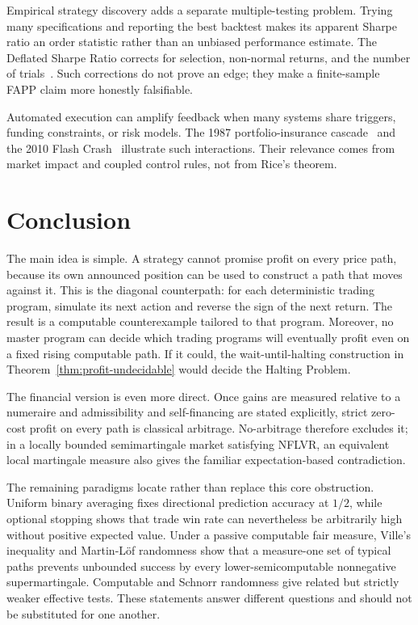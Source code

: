 \documentclass[aps,pra,reprint,superscriptaddress,amsmath,amssymb,floatfix]{revtex4-2}
\theoremstyle{plain}
\theoremstyle{definition}
\theoremstyle{remark}
\begin{document}
Empirical strategy discovery adds a separate multiple-testing problem. Trying
many specifications and reporting the best backtest makes its apparent Sharpe
ratio an order statistic rather than an unbiased performance estimate. The
Deflated Sharpe Ratio corrects for selection, non-normal returns, and the
number of trials~\cite{BaileyLopez2014}. Such corrections do not prove an edge;
they make a finite-sample FAPP claim more honestly falsifiable.

Automated execution can amplify feedback when many systems share triggers,
funding constraints, or risk models. The 1987 portfolio-insurance
cascade~\cite{Brady1988} and the 2010 Flash Crash~\cite{Kirilenko2017} illustrate
such interactions. Their relevance comes from market impact and coupled
control rules, not from Rice's theorem.

\section{Conclusion}
\label{sec:conclusion}

The main idea is simple. A strategy cannot promise profit on every price path,
because its own announced position can be used to construct a path that moves
against it. This is the diagonal counterpath: for each deterministic trading
program, simulate its next action and reverse the sign of the next return. The
result is a computable counterexample tailored to that program. Moreover, no
master program can decide which trading programs will eventually profit even
on a fixed rising computable path. If it could, the wait-until-halting
construction in Theorem~\ref{thm:profit-undecidable} would decide the Halting
Problem.

The financial version is even more direct. Once gains are measured relative
to a numeraire and admissibility and self-financing are stated explicitly,
strict zero-cost profit on every path is classical arbitrage. No-arbitrage
therefore excludes it; in a locally bounded semimartingale market satisfying
NFLVR, an equivalent local martingale measure also gives the familiar
expectation-based contradiction.

The remaining paradigms locate rather than replace this core obstruction.
Uniform binary averaging fixes directional prediction accuracy at \(1/2\),
while optional stopping shows that trade win rate can nevertheless be
arbitrarily high without positive expected value. Under a passive computable
fair measure, Ville's inequality and Martin-L\"of randomness show that a
measure-one set of typical paths prevents unbounded success by every
lower-semicomputable nonnegative supermartingale. Computable and Schnorr
randomness give related but strictly weaker effective tests. These statements
answer different questions and should not be substituted for one another.
\end{document}

